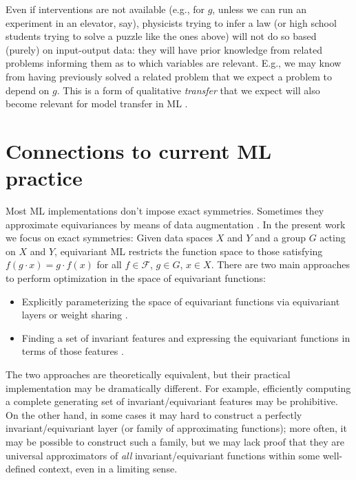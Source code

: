 \documentclass{article}
\theoremstyle{plain}
\theoremstyle{definition}
\theoremstyle{remark}
\begin{document}
Even if interventions are not available (e.g., for $g$, unless we can run an experiment in an elevator, say), physicists trying to infer a law (or high school students trying to solve a puzzle like the ones above) will not do so based (purely) on input-output data: they will have prior knowledge from related problems informing them as to which variables are relevant. E.g., we may know from having previously solved a related problem that we expect a problem to depend on $g$.
This is a form of qualitative {\em transfer} that we expect will also become relevant for model transfer in ML \cite{RojSchTurPet18}.

\section{Connections to current ML practice}\label{sec:practice}

Most ML implementations don't impose exact symmetries. Sometimes they approximate equivariances by means of data augmentation \cite{chen2020group, huang2022quantifying}.
In the present work we focus on exact symmetries: Given data spaces $X$ and $Y$ and a group $G$ acting on $X$ and $Y$, equivariant ML restricts the function space to those satisfying  $f(g\cdot x) = g \cdot f(x)$ for all $f\in \mathcal F$, $g\in G$, $x\in X$.
There are two main approaches to perform optimization in the space of equivariant functions:
\vspace{-1ex}\begin{itemize}
\parskip
\topsep 0pt
\partopsep 0pt
\parskip 0pt
    \item Explicitly parameterizing the space of equivariant functions via equivariant layers or weight sharing \cite{cohen2016group, kondor2018convolution, thomas2018tensor, geiger2022e3nn, finzi2020generalizing, finzi2021practical}.
    \item Finding a set of invariant features and expressing the equivariant functions in terms of those features \cite{villar2021scalars,blum2022equivariant}.
\end{itemize}\vspace{-1ex}
The two approaches are theoretically equivalent, but their practical implementation may be dramatically different. For example, efficiently computing a complete generating set of invariant/equivariant features may be prohibitive. On the other hand, in some cases it may hard to construct a perfectly invariant/equivariant layer (or family of approximating functions); more often, it may be possible to construct such a family, but we may lack proof that they are universal approximators of \textit{all} invariant/equivariant functions within some well-defined context, even in a limiting sense.
\end{document}
